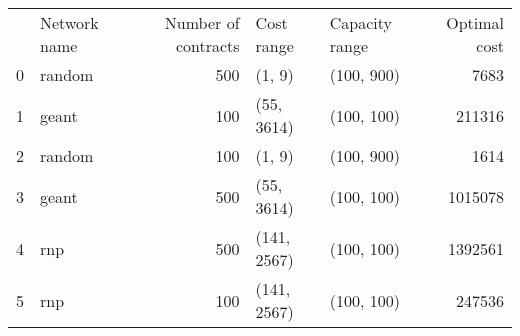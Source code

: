 \begin{tabular}{llrllr}
 & Network name & Number of contracts & Cost range & Capacity range & Optimal cost \\
0 & random & 500 & (1, 9) & (100, 900) & 7683 \\
1 & geant & 100 & (55, 3614) & (100, 100) & 211316 \\
2 & random & 100 & (1, 9) & (100, 900) & 1614 \\
3 & geant & 500 & (55, 3614) & (100, 100) & 1015078 \\
4 & rnp & 500 & (141, 2567) & (100, 100) & 1392561 \\
5 & rnp & 100 & (141, 2567) & (100, 100) & 247536 \\
\end{tabular}
